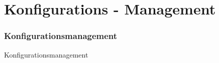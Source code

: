 
\section{Konfigurations - Management}
\begin{frame}[fragile]
	\frametitle{Konfigurationsmanagement}
\huge Konfigurationsmanagement
\end{frame}
